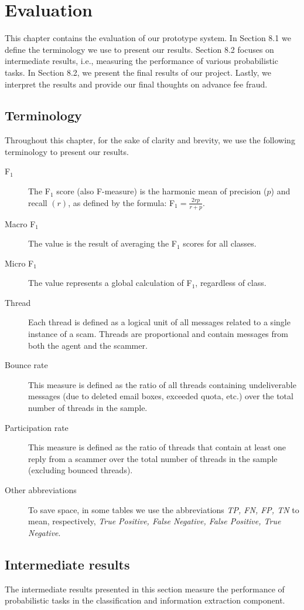 \chapter{Evaluation}
This chapter contains the evaluation of our prototype system. In Section 8.1 we define the terminology we use to present our results. Section 8.2 focuses on intermediate results, i.e., measuring the performance of various probabilistic tasks. In Section 8.2, we present the final results of our project. Lastly, we interpret the results and provide our final thoughts on advance fee fraud.

\section{Terminology}
Throughout this chapter, for the sake of clarity and brevity, we use the following terminology to present our results.
\begin{description}
\item[F$_{1}$] The F$_{1}$ score (also F-measure) is the harmonic mean of precision ($p$) and recall $(r)$, as defined by the formula: F$_{1} = \frac{2rp}{r + p}$.
\item[Macro F$_{1}$] The value is the result of averaging the F$_{1}$ scores for all classes.
\item[Micro F$_{1}$] The value represents a global calculation of F$_{1}$, regardless of class.
\item[Thread] Each thread is defined as a logical unit of all messages related to a single instance of a scam. Threads are proportional and contain messages from both the agent and the scammer.
\item[Bounce rate] This measure is defined as the ratio of all threads containing undeliverable messages (due to deleted email boxes, exceeded quota, etc.) over the total number of threads in the sample.
\item[Participation rate] This measure is defined as the ratio of threads that contain at least one reply from a scammer over the total number of threads in the sample (excluding bounced threads).
\item[Other abbreviations] To save space, in some tables we use the abbreviations \textit{TP, FN, FP, TN} to mean, respectively, \textit{True Positive, False Negative, False Positive, True Negative}.
\end{description}

\section{Intermediate results}
The intermediate results presented in this section measure the performance of probabilistic tasks in the classification and information extraction component.

